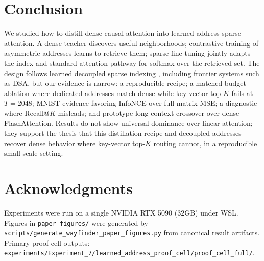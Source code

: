 \documentclass{article}
\begin{document}
\section{Conclusion}

We studied how to distill dense causal attention into learned-address sparse attention. A dense teacher discovers useful neighborhoods; contrastive training of asymmetric addresses learns to retrieve them; sparse fine-tuning jointly adapts the index and standard attention pathway for softmax over the retrieved set. The design follows learned decoupled sparse indexing \cite{sun2022lha,deepseek2025v32,desai2025hashattention,mazare2025saap}, including frontier systems such as DSA, but our evidence is narrow: a reproducible recipe; a matched-budget ablation where dedicated addresses match dense while key-vector top-$K$ fails at $T{=}2048$; MNIST evidence favoring InfoNCE over full-matrix MSE; a diagnostic where Recall@$K$ misleads; and prototype long-context crossover over dense FlashAttention. Results do not show universal dominance over linear attention; they support the thesis that this distillation recipe and decoupled addresses recover dense behavior where key-vector top-$K$ routing cannot, in a reproducible small-scale setting.

\section*{Acknowledgments}

Experiments were run on a single NVIDIA RTX 5090 (32GB) under WSL. Figures in \texttt{paper\_figures/} were generated by \texttt{scripts/generate\_wayfinder\_paper\_figures.py} from canonical result artifacts. Primary proof-cell outputs: \texttt{experiments/Experiment\_7/learned\_address\_proof\_cell/proof\_cell\_full/}.
\end{document}
